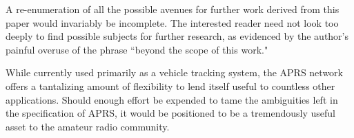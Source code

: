 A re-enumeration of all the possible avenues for further work
derived from this paper would invariably be incomplete.
The interested reader need not look too deeply to find possible subjects
for further research, as evidenced by the author's painful overuse of the
phrase ``beyond the scope of this work."

While currently used primarily as a vehicle tracking system,
the APRS network offers a tantalizing amount of flexibility to lend itself
useful to countless other applications.
Should enough effort be expended to tame the ambiguities left in the
specification of APRS,
it would be positioned to be a tremendously useful asset to the amateur
radio community.
